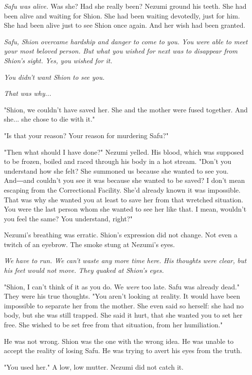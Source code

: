 \emph{Safu was alive.} Was she? Had she really been? Nezumi ground his teeth.
She had been alive and waiting for Shion. She had been waiting
devotedly, just for him. She had been alive just to see Shion once
again. And her wish had been granted.

\emph{Safu, Shion overcame hardship and danger to come to you. You were able
	to meet your most beloved person. But what you wished for next was to
	disappear from Shion's sight. Yes, you wished for it.}

\emph{You didn't want Shion to see you.}

\emph{That was why...}

"Shion, we couldn't have saved her. She and the mother were fused
together. And she... she chose to die with it."

"Is that your reason? Your reason for murdering Safu?"

"Then what should I have done?" Nezumi yelled. His blood, which was
supposed to be frozen, boiled and raced through his body in a hot
stream. "Don't you understand how she felt? She summoned us because she
wanted to see you. And―and couldn't you see it was because she wanted to
be saved? I don't mean escaping from the Correctional Facility. She'd
already known it was impossible. That was why she wanted you at least to
save her from that wretched situation. You were the last person whom she
wanted to see her like that. I mean, wouldn't you feel the same? You
understand, right?"

Nezumi's breathing was erratic. Shion's expression did not change. Not
even a twitch of an eyebrow. The smoke stung at Nezumi's eyes.

\emph{We have to run. We can't waste any more time here. His thoughts were
	clear, but his feet would not move. They quaked at Shion's eyes.}

"Shion, I can't think of it as you do. We \emph{were} too late. Safu was
already dead." They were his true thoughts. "You aren't looking at
reality. It would have been impossible to separate her from the mother.
She even said so herself: she had no body, but she was still trapped.
She said it hurt, that she wanted you to set her free. She wished to be
set free from that situation, from her humiliation."

He was not wrong. Shion was the one with the wrong idea. He was unable
to accept the reality of losing Safu. He was trying to avert his eyes
from the truth.

"You used her." A low, low mutter. Nezumi did not catch it.

